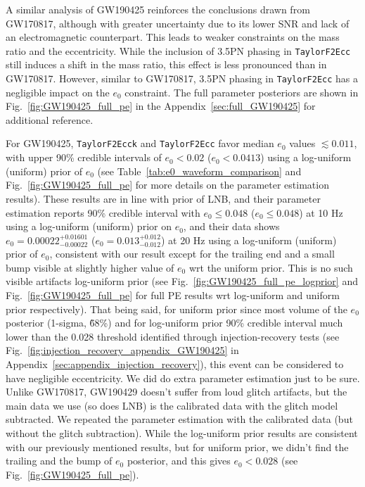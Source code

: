 \documentclass[aps,prd,twocolumn,superscriptaddress,groupedaddress,nofootinbib,showpacs,eqsecnum,useAms]{revtex4-2}
\begin{document}
A similar analysis of GW190425 reinforces the conclusions drawn from GW170817, although with greater uncertainty due to its lower SNR and lack of an electromagnetic counterpart. This leads to weaker constraints on the mass ratio and the eccentricity. While the inclusion of 3.5PN phasing in \texttt{TaylorF2Ecc} still induces a shift in the mass ratio, this effect is less pronounced than in GW170817. However, similar to GW170817, 3.5PN phasing in \texttt{TaylorF2Ecc} has a negligible impact on the $e_0$ constraint. The full parameter posteriors are shown in Fig.~\ref{fig:GW190425_full_pe} in the Appendix~\ref{sec:full_GW190425} for additional reference.

  For GW190425, \texttt{TaylorF2Ecck} and \texttt{TaylorF2Ecc} favor median $e_0$ values $\lesssim 0.011$, with upper 90\% credible intervals of $e_0 < 0.02$ ($e_0 < 0.0413$) using a log-uniform (uniform) prior of $e_0$ (see Table~\ref{tab:e0_waveform_comparison} and Fig.~\ref{fig:GW190425_full_pe} for more details on the parameter estimation results). 
  These results are in line with prior of LNB, and their parameter estimation reports 90\% credible interval with $e_0 \leq 0.048$ ($e_0 \leq 0.048$) at 10 Hz using a log-uniform (uniform) prior on $e_0$, and their data shows $e_0 = 0.00022^{+0.01601}_{-0.00022}$ ($e_0 = 0.013^{+0.012}_{-0.012}$) at 20 Hz using a log-uniform (uniform) prior of $e_0$, consistent with our result except for the trailing end and a small bump visible at slightly higher value of $e_0$ wrt the uniform prior. This is no such visible artifacts log-uniform prior (see Fig.~\ref{fig:GW190425_full_pe_logprior} and Fig.~\ref{fig:GW190425_full_pe} for full PE results wrt log-uniform and uniform prior respectively). That being said, for uniform prior since most volume of the $e_0$ posterior (1-sigma, \~68\%) and for log-uniform prior 90\% credible interval much lower than the 0.028 threshold identified through injection-recovery tests (see Fig.~\ref{fig:injection_recovery_appendix_GW190425} in Appendix~\ref{sec:appendix_injection_recovery}), this event can be considered to have negligible eccentricity.
  We did do extra parameter estimation just to be sure. Unlike GW170817, GW190429 doesn't suffer from loud glitch artifacts, but the main data we use (so does LNB) is the calibrated data with the glitch model subtracted. We repeated the parameter estimation with the calibrated data (but without the glitch subtraction). While the log-uniform prior results are consistent with our previously mentioned results,  but for uniform prior, we didn't find the trailing and the bump of $e_0$ posterior, and this gives $e_0<0.028$ (see Fig.~\ref{fig:GW190425_full_pe}).  
  
\end{document}
